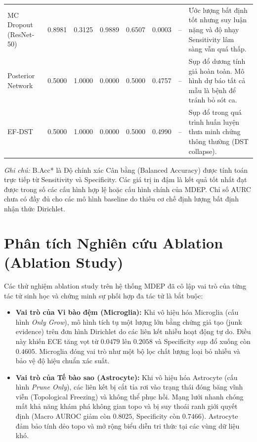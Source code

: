 \documentclass[11pt, a4paper]{article}
\begin{document}
\begin{table}[H]
{\begin{tabular}{lccccccm{7.5cm}}
MC Dropout (ResNet-50) & 0.8981 & 0.3125 & 0.9889 & 0.6507 & 0.0003 & -- & Ước lượng bất định tốt nhưng suy luận nặng và độ nhạy Sensitivity lâm sàng vẫn quá thấp. \\
Posterior Network & 0.5000 & 1.0000 & 0.0000 & 0.5000 & 0.4757 & -- & Sụp đổ dương tính giả hoàn toàn. Mô hình dự báo tất cả mẫu là bệnh để tránh bỏ sót ca. \\
EF-DST & 0.5000 & 1.0000 & 0.0000 & 0.5000 & 0.4990 & -- & Sụp đổ trong quá trình huấn luyện thưa minh chứng thông thường (DST collapse). \\
\bottomrule
\end{tabular}
}
\begin{flushleft}
\small
\textit{Ghi chú:} B.Acc* là Độ chính xác Cân bằng (Balanced Accuracy) được tính toán trực tiếp từ Sensitivity và Specificity. Các giá trị in đậm là kết quả tốt nhất đạt được trong số các cấu hình hợp lệ hoặc cấu hình chính của MDEP. Chỉ số AURC chưa có đầy đủ cho các mô hình baseline do thiếu cơ chế định lượng bất định nhận thức Dirichlet.
\end{flushleft}
\end{table}

\section{Phân tích Nghiên cứu Ablation (Ablation Study)}
Các thử nghiệm ablation study trên hệ thống MDEP đã cô lập vai trò của từng tác tử sinh học và chứng minh sự phối hợp đa tác tử là bắt buộc:
\begin{itemize}
    \item \textbf{Vai trò của Vi bào đệm (Microglia):} Khi vô hiệu hóa Microglia (cấu hình \emph{Only Grow}), mô hình tích tụ một lượng lớn bằng chứng giả tạo (junk evidence) trên đơn hình Dirichlet do các liên kết nhiễu hoạt động tự do. Điều này khiến ECE tăng vọt từ $0.0479$ lên $0.2058$ và Specificity sụp đổ xuống còn $0.4605$. Microglia đóng vai trò như một bộ lọc chất lượng loại bỏ nhiễu và bảo vệ độ hiệu chuẩn xác suất.
    \item \textbf{Vai trò của Tế bào sao (Astrocyte):} Khi vô hiệu hóa Astrocyte (cấu hình \emph{Prune Only}), các liên kết bị cắt tỉa rơi vào trạng thái đóng băng vĩnh viễn (Topological Freezing) và không thể phục hồi. Mạng lưới nhanh chóng mất khả năng khám phá không gian topo và bị suy thoái ranh giới quyết định (Macro AUROC giảm còn $0.8025$, Specificity còn $0.7466$). Astrocyte đảm bảo tính dẻo topo và mở rộng biểu diễn tri thức tại các vùng dữ liệu khó.
\end{itemize}
\end{document}
